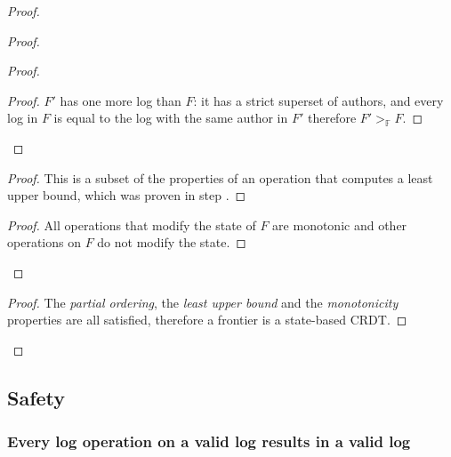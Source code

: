 \documentclass[9pt, oneside]{article}   	%
\begin{document}
\begin{proof}
\begin{proof}
\begin{proof}
			\begin{proof}
				$F'$ has one more log than $F$: it has a strict superset of authors, and every log in $F$ is equal to the log with the same author in $F'$ therefore $F' >_\mathds{F} F$.
			\end{proof}		
		\end{proof}
		
		\begin{proof}
			This is a subset of the properties of an operation that computes a least upper bound, which was proven in step .
		\end{proof}
		
		\qedstep{}
		\begin{proof}
			All operations that modify the state of $F$ are monotonic and other operations on $F$ do not modify the state.
		\end{proof}
	\end{proof}
	
	\qedstep{}
	\begin{proof}
		The \textit{partial ordering}, the \textit{least upper bound} and the \textit{monotonicity} properties are all satisfied, therefore a frontier is a state-based CRDT.
	\end{proof}

\end{proof}

\subsection{Safety}

\subsubsection{Every log operation on a valid log results in a valid log}
\label{sec:proofs:valid-log}
\end{document}
